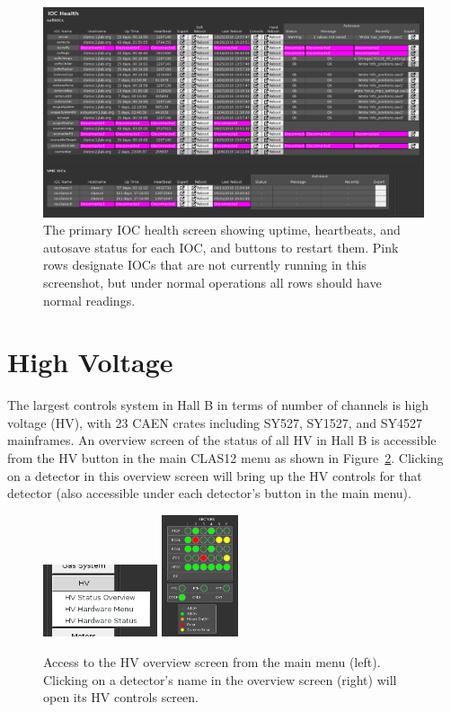 \documentclass[amsmath,amssymb,notitlepage,11pt]{revtex4}
\begin{document}
\begin{figure}[htbp]\centering
  \includegraphics[width=\textwidth]{pics/iochealth}
  \caption{The primary IOC health screen showing uptime, heartbeats, and autosave status for each IOC, and buttons to restart them.  Pink rows designate IOCs that are not currently running in this screenshot, but under normal operations all rows should have normal readings.  \label{fig:iochealth}}
\end{figure}

\clearpage

\section{High Voltage}
The largest controls system in Hall B in terms of number of channels is high voltage (HV), with 23 CAEN crates including SY527, SY1527, and SY4527 mainframes.  An overview screen of the status of all HV in Hall B is accessible from the HV button in the main CLAS12 menu as shown in Figure~\ref{fig:hv}.  Clicking on a detector in this overview screen will bring up the HV controls for that detector (also accessible under each detector's button in the main menu).

\begin{figure}[htbp]\centering
  \includegraphics[width=0.3\textwidth]{pics/hvmenu}
  \includegraphics[width=0.2\textwidth]{pics/hvstat}
  \caption{Access to the HV overview screen from the main menu (left).  Clicking on a detector's name in the overview screen (right) will open its HV controls screen.\label{fig:hv}}
\end{figure}
\end{document}
